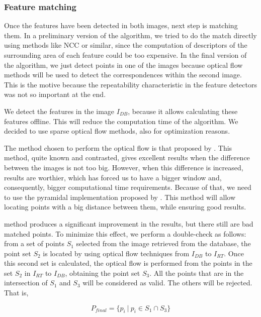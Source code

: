 \subsubsection{Feature matching}\label{ch:chapter01_01_02_02}

Once the features have been detected in both images, next step is matching them. In a preliminary version of the algorithm, we tried to do the match directly using methods like \acf{NCC} or similar, since the computation of descriptors of the surrounding area of each feature could be too expensive. In the final version of the algorithm, we just detect points in one of the images because optical flow methods will be used to detect the correspondences within the second image. This is the motive because the repeatability characteristic in the feature detectors was not so important at the end.

We detect the features in the image $I_{DB}$, because it allows calculating these features offline. This will reduce the computation time of the algorithm. We decided to use sparse optical flow methods, also for optimization reasons.

The method chosen to perform the optical flow is that proposed by \cite{lucas1981iterative}. This method, quite known and contrasted, gives excellent results when the difference between the images is not too big. However, when this difference is increased, results are worthier, which has forced us to have a bigger window and, consequently, bigger computational time requirements. Because of that, we need to use the pyramidal implementation proposed by \cite{bouguet2001pyramidal}. This method will allow locating points with a big distance between them, while ensuring good results.

\cite{bouguet2001pyramidal} method produces a significant improvement in the results, but there still are bad matched points. To minimize this effect, we perform a double-check as follows: from a set of points $S_1$ selected from the image retrieved from the database, the point set $S_2$ is located by using optical flow techniques from $I_{DB}$ to $I_{RT}$. Once this second set is calculated, the optical flow is performed from the points in the set $S_2$ in $I_{RT}$ to $I_{DB}$, obtaining the point set $S_3$. All the points that are in the intersection of $S_1$ and $S_3$ will be considered as valid. The others will be rejected. That is,

\begin{equation}\label{eq:cp01_rejected_points}
P_{final} = \{ p_i ~|~ p_i \in S_1 \cap S_3 \}
\end{equation}

